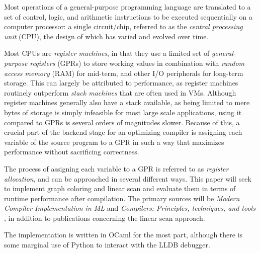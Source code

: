\documentclass{article}
\begin{document}
Most operations of a general-purpose programming language are translated to a set of control, logic, and arithmetic instructions to be executed sequentially on a computer processor: a single circuit/chip, referred to as the \textit{central processing unit} (CPU), the design of which has varied and evolved over time.

Most CPUs are \textit{register machines}, in that they use a limited set of \textit{general-purpose registers} (GPRs) to store working values in combination with \textit{random access memory} (RAM) for mid-term, and other I/O peripherals for long-term storage. This can largely be attributed to performance, as register machines routinely outperform \textit{stack machines} \parencite{ShiYunhe2008VmsS} that are often used in VMs.
Although register machines generally also have a stack available, as being limited to mere bytes of storage is simply infeasible for most large scale applications, using it compared to GPRs is several orders of magnitudes slower.
Because of this, a crucial part of the backend stage for an optimizing compiler is assigning each variable  of the source program to a GPR in such a way that maximizes performance without sacrificing correctness.



The process of assigning each variable to a GPR is referred to as \textit{register allocation}, and can be approached in several different ways. This paper will seek to implement graph coloring and linear scan and evaluate them in terms of runtime performance after compilation. %
The primary sources will be \textit{Modern Compiler Implementation in ML} \parencite{tiger} and \textit{Compilers: Principles, techniques, and tools} \parencite{dragon}, in addition to publications concerning the linear scan approach.

The implementation is written in OCaml for the most part, although there is some marginal use of Python to interact with the LLDB debugger.




\end{document}
